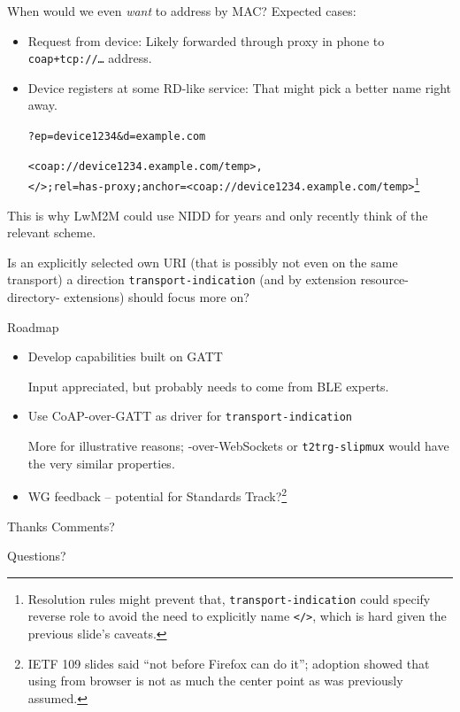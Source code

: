 \documentclass[aspectratio=169,colorlinks]{beamer}
\begin{document}
\begin{frame}{When would we even \textit{want} to address by MAC?}\large
	Expected cases:

	\begin{itemize}
		\item Request from device: Likely forwarded through proxy in phone to \texttt{coap+tcp://\ldots} address.
		\item Device registers at some RD-like service: That might pick a better name right away.

			\texttt{?ep=device1234\&d=example.com}

			\texttt{<coap://device1234.example.com/temp>,}\\
			\texttt{</>;rel=has-proxy;anchor=<coap://device1234.example.com/temp>}\footnote{Resolution rules might prevent that, \texttt{transport-indication} could specify reverse role to avoid the need to explicitly name \texttt{</>}, which is hard given the previous slide's caveats.}
	\end{itemize}

	{\footnotesize This is why LwM2M could use NIDD for years and only recently think of the relevant scheme.}

	\bigskip

	Is an explicitly selected own URI (that is possibly not even on the same transport) a direction \texttt{transport-indication} (and by extension {\ttfamily resource-directory- extensions}) should focus more on?
\end{frame}

\begin{frame}{Roadmap}\large
	\begin{itemize}
		\item Develop capabilities built on GATT

			Input appreciated, but probably needs to come from BLE experts.

		\item Use CoAP-over-GATT as driver for \texttt{transport-indication}

			More for illustrative reasons; -over-WebSockets or \texttt{t2trg-slipmux} would have the very similar properties.
		\item WG feedback -- potential for Standards Track?\footnote{IETF 109 slides said ``not before Firefox can do it''; adoption showed that using from browser is not as much the center point as was previously assumed.}
	\end{itemize}
\end{frame}

\begin{frame}{Thanks}\Large
	Comments?

	\bigskip

	Questions?
\end{frame}
\end{document}
